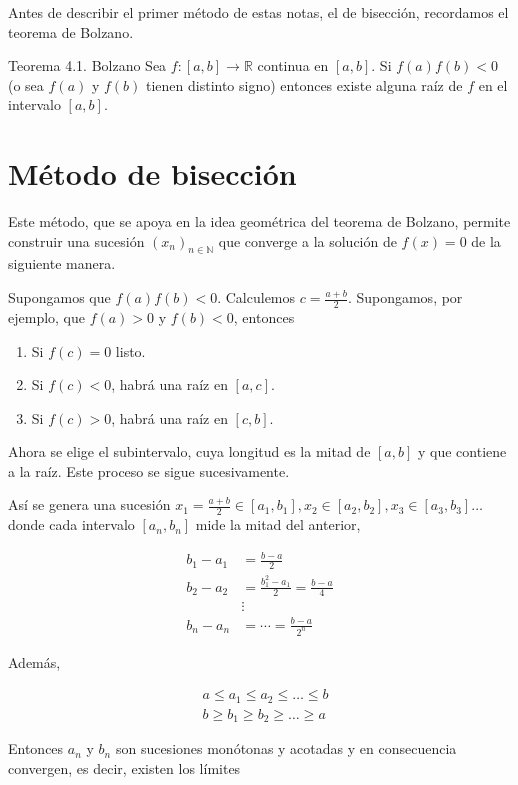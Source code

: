 \documentclass[10pt]{book}
\begin{document}
Antes de describir el primer método de estas notas, el de bisección, recordamos el teorema de Bolzano.

Teorema 4.1. Bolzano Sea $f:[a, b] \rightarrow \mathbb{R}$ continua en $[a, b]$. Si $f(a) f(b)<0$ (o sea $f(a)$ y $f(b)$ tienen distinto signo) entonces existe alguna raíz de $f$ en el intervalo $[a, b]$.

\section{Método de bisección}
Este método, que se apoya en la idea geométrica del teorema de Bolzano, permite construir una sucesión $\left(x_{n}\right)_{n \in \mathbb{N}}$ que converge a la solución de $f(x)=0$ de la siguiente manera.

Supongamos que $f(a) f(b)<0$. Calculemos $c=\frac{a+b}{2}$. Supongamos, por ejemplo, que $f(a)>0$ y $f(b)<0$, entonces

\begin{enumerate}
  \item Si $f(c)=0$ listo.
  \item Si $f(c)<0$, habrá una raíz en $[a, c]$.
  \item Si $f(c)>0$, habrá una raíz en $[c, b]$.
\end{enumerate}

Ahora se elige el subintervalo, cuya longitud es la mitad de $[a, b]$ y que contiene a la raíz. Este proceso se sigue sucesivamente.

Así se genera una sucesión $x_{1}=\frac{a+b}{2} \in\left[a_{1}, b_{1}\right], x_{2} \in\left[a_{2}, b_{2}\right], x_{3} \in\left[a_{3}, b_{3}\right] \ldots$ donde cada intervalo $\left[a_{n}, b_{n}\right]$ mide la mitad del anterior,

$$
\begin{aligned}
b_{1}-a_{1} & =\frac{b-a}{2} \\
b_{2}-a_{2} & =\frac{b_{1}^{2}-a_{1}}{2}=\frac{b-a}{4} \\
& \vdots \\
b_{n}-a_{n} & =\cdots=\frac{b-a}{2^{n}}
\end{aligned}
$$

Además,

$$
\begin{aligned}
& a \leq a_{1} \leq a_{2} \leq \ldots \leq b \\
& b \geq b_{1} \geq b_{2} \geq \ldots \geq a
\end{aligned}
$$

Entonces $a_{n}$ y $b_{n}$ son sucesiones monótonas y acotadas y en consecuencia convergen, es decir, existen los límites
\end{document}

